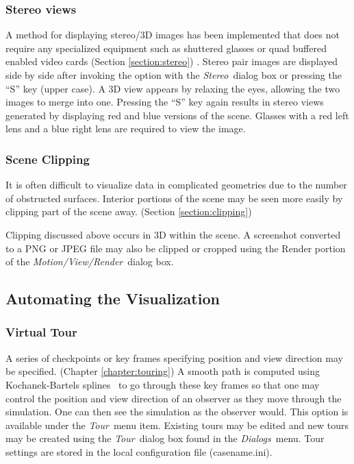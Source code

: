 \documentclass[11pt,twoside]{book}
\begin{document}
\subsubsection{Stereo views}A method for displaying stereo/3D
images has been implemented that does
not require any specialized equipment such as shuttered glasses or
quad buffered enabled video cards (Section \ref{section:stereo}) .
Stereo pair images are displayed side by side after invoking the option with
the {\em Stereo}\ dialog box or pressing the ``S'' key (upper case).
A 3D view appears by relaxing the eyes, allowing the two images to merge into one.
Pressing the ``S'' key again results in stereo views generated by
displaying red and blue versions of the scene.
Glasses with a red left lens and a blue right lens are required to view the image.

\subsubsection{Scene Clipping} It is often difficult to visualize data
in complicated geometries due to the number of obstructed
surfaces. Interior portions of the scene may be seen more easily
by clipping part of the scene away. (Section
\ref{section:clipping})

Clipping discussed above occurs in 3D within the scene.  A
screenshot converted to a PNG or JPEG file may also be clipped or
cropped using the Render portion of the {\em Motion/View/Render}\
dialog box.

\subsection{Automating the Visualization}
\subsubsection{Virtual Tour}   A series of checkpoints or key frames
specifying position and view direction may be specified. (Chapter
\ref{chapter:touring}) A smooth path is computed using
Kochanek-Bartels splines~\cite{Moller:02} to go through these key
frames so that one may control the position and view direction of
an observer as they move through the simulation. One can then see
the simulation as the observer would. This option is available
under the {\em Tour}\ menu item. Existing tours may be edited and
new tours may be created using the {\em Tour}\ dialog box found in
the {\em Dialogs}\ menu. Tour settings are stored in the local
configuration file (casename.ini).
\end{document}

